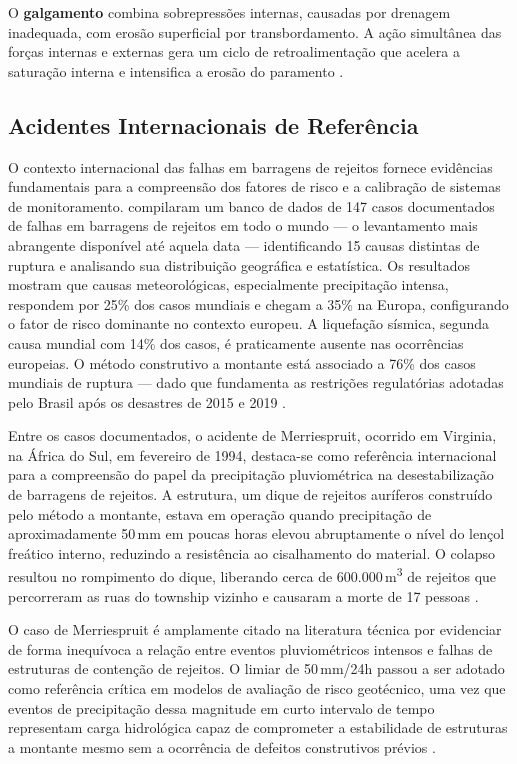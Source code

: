 O \textbf{galgamento} combina sobrepressões internas, causadas por drenagem inadequada, com erosão superficial por transbordamento. A ação simultânea das forças internas e externas gera um ciclo de retroalimentação que acelera a saturação interna e intensifica a erosão do paramento \cite{arnez1999avaliacao}.

\subsection{Acidentes Internacionais de Referência}
\label{subsec:acidentes_internacionais}

O contexto internacional das falhas em barragens de rejeitos fornece
evidências fundamentais para a compreensão dos fatores de risco e a
calibração de sistemas de monitoramento. 
compilaram um banco de dados de 147 casos documentados de falhas em
barragens de rejeitos em todo o mundo --- o levantamento mais abrangente
disponível até aquela data --- identificando 15 causas distintas de
ruptura e analisando sua distribuição geográfica e estatística. Os
resultados mostram que causas meteorológicas, especialmente precipitação
intensa, respondem por 25\% dos casos mundiais e chegam a 35\% na Europa,
configurando o fator de risco dominante no contexto europeu. A liquefação
sísmica, segunda causa mundial com 14\% dos casos, é praticamente ausente
nas ocorrências europeias. O método construtivo a montante está associado
a 76\% dos casos mundiais de ruptura --- dado que fundamenta as
restrições regulatórias adotadas pelo Brasil após os desastres de 2015 e
2019 \cite{rico2008mine}.

Entre os casos documentados, o acidente de Merriespruit, ocorrido em
Virginia, na África do Sul, em fevereiro de 1994, destaca-se como
referência internacional para a compreensão do papel da precipitação
pluviométrica na desestabilização de barragens de rejeitos. A estrutura,
um dique de rejeitos auríferos construído pelo método a montante, estava
em operação quando precipitação de aproximadamente 50\,mm em poucas horas
elevou abruptamente o nível do lençol freático interno, reduzindo a
resistência ao cisalhamento do material. O colapso resultou no
rompimento do dique, liberando cerca de 600.000\,m\textsuperscript{3}
de rejeitos que percorreram as ruas do township vizinho e causaram a
morte de 17 pessoas \cite{rico2008mine}.

O caso de Merriespruit é amplamente citado na literatura técnica por
evidenciar de forma inequívoca a relação entre eventos pluviométricos
intensos e falhas de estruturas de contenção de rejeitos. O limiar de
50\,mm/24h passou a ser adotado como referência crítica em modelos de
avaliação de risco geotécnico, uma vez que eventos de precipitação
dessa magnitude em curto intervalo de tempo representam carga hidrológica
capaz de comprometer a estabilidade de estruturas a montante mesmo sem
a ocorrência de defeitos construtivos prévios \cite{rico2008mine}.

